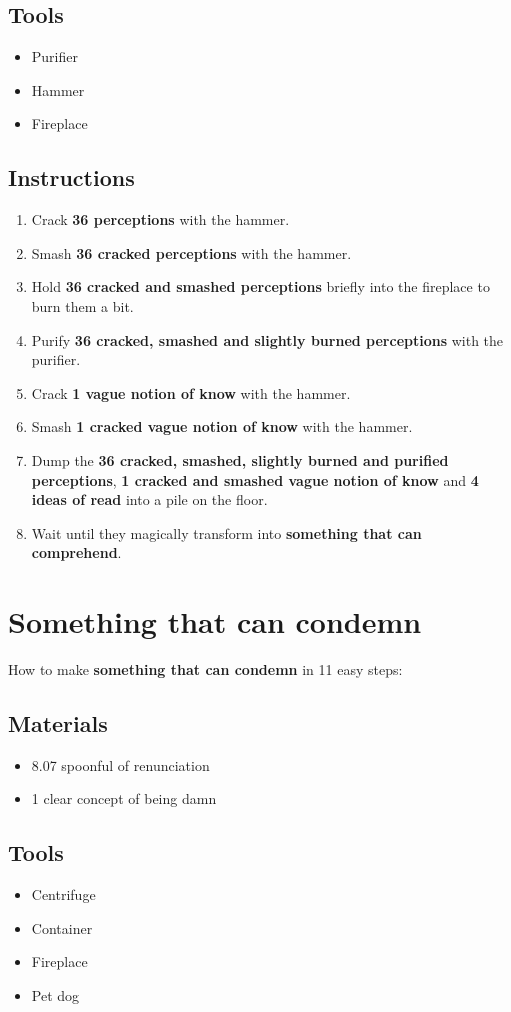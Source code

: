 \documentclass{article}
\begin{document}
\subsection{Tools}\begin{itemize}
\item 
Purifier
\item 
Hammer
\item 
Fireplace
\end{itemize}
\subsection{Instructions}\begin{enumerate}
\item 
Crack \textbf{36 perceptions} with the hammer.
\item 
Smash \textbf{36 cracked perceptions} with the hammer.
\item 
Hold \textbf{36 cracked and smashed perceptions} briefly into the fireplace to burn them a bit.
\item 
Purify \textbf{36 cracked, smashed and slightly burned perceptions} with the purifier.
\item 
Crack \textbf{1 vague notion of know} with the hammer.
\item 
Smash \textbf{1 cracked vague notion of know} with the hammer.
\item 
Dump the \textbf{36 cracked, smashed, slightly burned and purified perceptions}, \textbf{1 cracked and smashed vague notion of know} and \textbf{4 ideas of read} into a pile on the floor.
\item 
Wait until they magically transform into \textbf{something that can comprehend}.
\end{enumerate}
\newpage
\section{Something that can condemn}How to make \textbf{something that can condemn} in 11 easy steps:

\subsection{Materials}\begin{itemize}
\item 
8.07 spoonful of renunciation
\item 
1 clear concept of being damn
\end{itemize}
\subsection{Tools}\begin{itemize}
\item 
Centrifuge
\item 
Container
\item 
Fireplace
\item 
Pet dog
\end{itemize}
\end{document}
